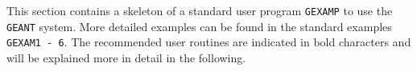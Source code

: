     
This section contains a skeleton of a standard user program {\tt GEXAMP}
to use the
{\tt GEANT} system. More detailed examples can be found in the
standard examples {\tt GEXAM1 - 6}. The recommended user routines
are indicated in bold characters and will be explained more in detail
in the following.

